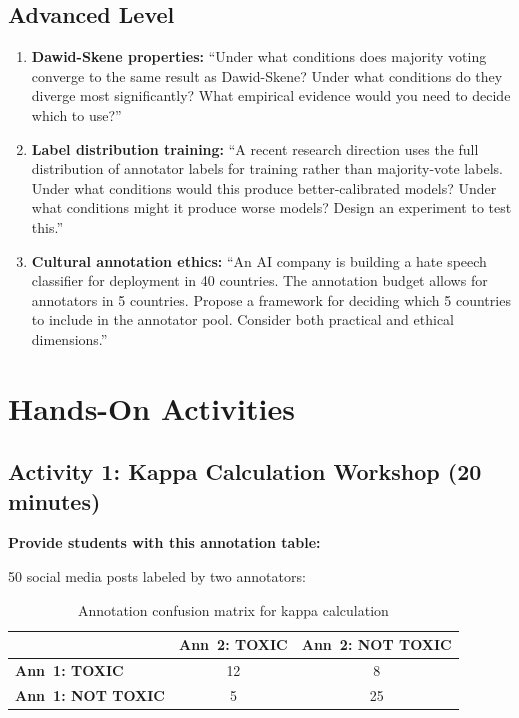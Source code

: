 \subsection{Advanced Level}

\begin{enumerate}
    \item \textbf{Dawid-Skene properties:} ``Under what conditions does majority voting converge to the same result as Dawid-Skene? Under what conditions do they diverge most significantly? What empirical evidence would you need to decide which to use?''

    \item \textbf{Label distribution training:} ``A recent research direction uses the full distribution of annotator labels for training rather than majority-vote labels. Under what conditions would this produce better-calibrated models? Under what conditions might it produce worse models? Design an experiment to test this.''

    \item \textbf{Cultural annotation ethics:} ``An AI company is building a hate speech classifier for deployment in 40 countries. The annotation budget allows for annotators in 5 countries. Propose a framework for deciding which 5 countries to include in the annotator pool. Consider both practical and ethical dimensions.''
\end{enumerate}

\section{Hands-On Activities}

\subsection{Activity 1: Kappa Calculation Workshop (20 minutes)}

\textbf{Provide students with this annotation table:}

50 social media posts labeled by two annotators:

\begin{table}[htbp]
\caption{Annotation confusion matrix for kappa calculation}
\label{tab:annotation-matrix-ch07}
\centering
\begin{tabular}{@{}lcc@{}}
\toprule
 & \textbf{Ann~2: TOXIC} & \textbf{Ann~2: NOT TOXIC} \\
\midrule
\textbf{Ann~1: TOXIC} & 12 & 8 \\
\textbf{Ann~1: NOT TOXIC} & 5 & 25 \\
\bottomrule
\end{tabular}
\end{table}

